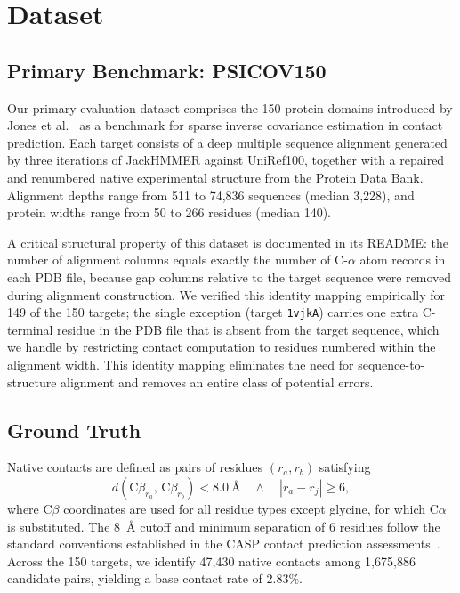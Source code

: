 \section{Dataset}
\label{sec:methods-data}

\subsection{Primary Benchmark: PSICOV150}
\label{sec:psicov-data}

Our primary evaluation dataset comprises the 150 protein domains introduced
by Jones et al.\ \cite{jones2012} as a benchmark for sparse inverse covariance
estimation in contact prediction.  Each target consists of a deep multiple
sequence alignment generated by three iterations of JackHMMER against
UniRef100, together with a repaired and renumbered native experimental
structure from the Protein Data Bank.  Alignment depths range from 511 to
74{,}836 sequences (median 3{,}228), and protein widths range from 50 to 266
residues (median 140).

A critical structural property of this dataset is documented in its README:
the number of alignment columns equals exactly the number of C-$\alpha$ atom
records in each PDB file, because gap columns relative to the target sequence
were removed during alignment construction.  We verified this identity mapping
empirically for 149 of the 150 targets; the single exception (target
\texttt{1vjkA}) carries one extra C-terminal residue in the PDB file that is
absent from the target sequence, which we handle by restricting contact
computation to residues numbered within the alignment width.  This identity
mapping eliminates the need for sequence-to-structure alignment and removes an
entire class of potential errors.

\subsection{Ground Truth}
\label{sec:ground-truth}

Native contacts are defined as pairs of residues $(r_a, r_b)$ satisfying
\begin{equation}
	d(\mathrm{C}\beta_{r_a},\, \mathrm{C}\beta_{r_b}) < 8.0~\text{\AA}
	\quad \wedge \quad |r_a - r_j| \geq 6,
	\label{eq:contact-def}
\end{equation}
where $\mathrm{C}\beta$ coordinates are used for all residue types except
glycine, for which $\mathrm{C}\alpha$ is substituted.  The 8~\AA{} cutoff and
minimum separation of 6 residues follow the standard conventions established
in the CASP contact prediction assessments~\cite{ezkurdia2009}.  Across the
150 targets, we identify 47{,}430 native contacts among 1{,}675{,}886 candidate
pairs, yielding a base contact rate of 2.83\%.

